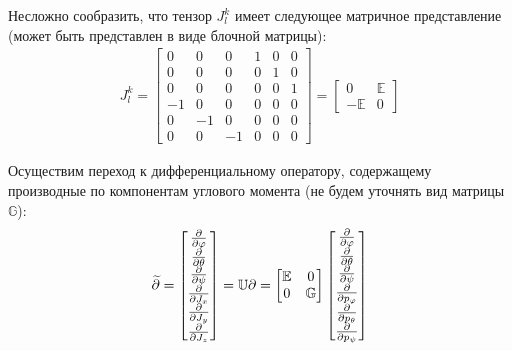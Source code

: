 \documentclass[12pt]{article}
\newcommand{\bbU}{\mathbb{U}}
\newcommand{\bbG}{\mathbb{G}}
\newcommand{\bbE}{\mathbb{E}}
\begin{document}
Несложно сообразить, что тензор $J^{k}_{l}$ имеет следующее матричное представление (может быть представлен в виде блочной матрицы):
\begin{gather}
	J^{k}_{l} =
	\begin{bmatrix}
		0 & 0 & 0 & 1 & 0 & 0 \\
		0 & 0 & 0 & 0 & 1 & 0 \\
		0 & 0 & 0 & 0 & 0 & 1 \\
	       -1 & 0 & 0 & 0 & 0 & 0 \\
	       0 & -1 & 0 & 0 & 0 & 0 \\
	       0 & 0 & -1 & 0 & 0 & 0
	\end{bmatrix} =
	\begin{bmatrix}
		0 & \bbE \\
		-\bbE & 0
	\end{bmatrix}
\end{gather}

Осуществим переход к дифференциальному оператору, содержащему производные по компонентам углового момента (не будем уточнять вид матрицы $\bbG$):
\begin{gather}
	\widetilde{\partial} = 
	\begin{bmatrix}
		\frac{\partial}{\partial \varphi} \\
		\frac{\partial}{\partial \theta} \\
		\frac{\partial}{\partial \psi} \\
		\frac{\partial}{\partial J_x} \\
		\frac{\partial}{\partial J_y} \\
		\frac{\partial}{\partial J_z} \\
	\end{bmatrix} = \bbU \partial =  
	\begin{bmatrix}
		\bbE & 0 \\
		0 & \bbG
	\end{bmatrix}
	\begin{bmatrix}
		\frac{\partial}{\partial \varphi} \\
		\frac{\partial}{\partial \theta} \\
		\frac{\partial}{\partial \psi} \\
		\frac{\partial}{\partial p_\varphi} \\
		 \frac{\partial}{\partial p_\theta} \\
		\frac{\partial}{\partial p_\psi} \\
	\end{bmatrix} \notag
\end{gather}
\end{document}
